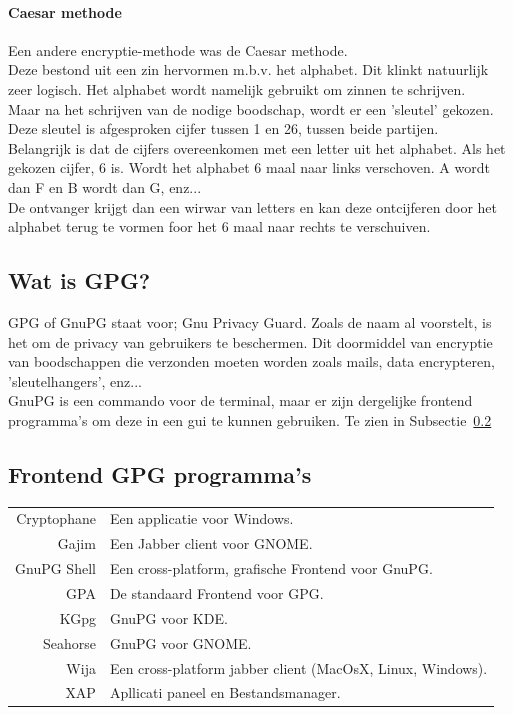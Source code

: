 \documentclass[12pt]{article}
\begin{document}
\paragraph{Caesar methode}
Een andere encryptie-methode was de Caesar methode.\\
Deze bestond uit een zin hervormen m.b.v. het alphabet. Dit klinkt natuurlijk zeer logisch.
Het alphabet wordt namelijk gebruikt om zinnen te schrijven.\\
Maar na het schrijven van de nodige boodschap, wordt er een 'sleutel' gekozen. Deze sleutel is afgesproken cijfer tussen 1 en 26, tussen beide partijen.\\
Belangrijk is dat de cijfers overeenkomen met een letter uit het alphabet. Als het gekozen cijfer, 6 is. Wordt het alphabet 6 maal naar links verschoven. A wordt dan F en B wordt dan G, enz...\\
De ontvanger krijgt dan een wirwar van letters en kan deze ontcijferen door het alphabet terug te vormen foor het 6 maal naar rechts te verschuiven.

\subsection{Wat is GPG?}
GPG of GnuPG staat voor; Gnu Privacy Guard. Zoals de naam al voorstelt, is het om de privacy van gebruikers te beschermen. Dit doormiddel van encryptie van boodschappen die verzonden moeten worden zoals mails, data encrypteren, 'sleutelhangers', enz... \\
GnuPG is een commando voor de terminal, maar er zijn dergelijke frontend programma's om deze in een gui te kunnen gebruiken. Te zien in Subsectie~\ref{GUI}

\subsection{Frontend GPG programma's}\label{GUI}
\begin{center}
\begin{tabular}{r|l}
Cryptophane	&	Een applicatie voor Windows.\\
Gajim		&	Een Jabber client voor GNOME.\\
GnuPG Shell	&	Een cross-platform, grafische Frontend voor GnuPG.\\
GPA			&	De standaard Frontend voor GPG.\\
KGpg		&	GnuPG voor KDE.\\
Seahorse	&	GnuPG voor GNOME.\\
Wija		&	Een cross-platform jabber client (MacOsX, Linux, Windows).\\
XAP			&	Apllicati paneel en Bestandsmanager.\\
\end{tabular}
\end{center}
\end{document}
